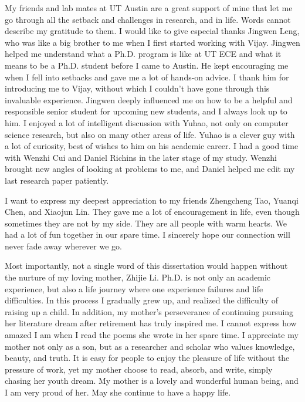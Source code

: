 \begin{acknowledgments}
My friends and lab mates at UT Austin are a great support of mine that let me go through all the setback and challenges in research, and in life. Words cannot describe my gratitude to them. I would like to give especial thanks Jingwen Leng, who was like a big brother to me when I first started working with Vijay. Jingwen helped me understand what a Ph.D. program is like at UT ECE and what it means to be a Ph.D. student before I came to Austin. He kept encouraging me when I fell into setbacks and gave me a lot of hands-on advice. I thank him for introducing me to Vijay, without which I couldn't have gone through this invaluable experience. Jingwen deeply influenced me on how to be a helpful and responsible senior student for upcoming new students, and I always look up to him. I enjoyed a lot of intelligent discussion with Yuhao, not only on computer science research, but also on many other areas of life. Yuhao is a clever guy with a lot of curiosity, best of wishes to him on his academic career. I had a good time with Wenzhi Cui and Daniel Richins in the later stage of my study. Wenzhi brought new angles of looking at problems to me, and Daniel helped me edit my last research paper patiently.

I want to express my deepest appreciation to my friends Zhengcheng Tao, Yuanqi Chen, and Xiaojun Lin. They gave me a lot of encouragement in life, even though sometimes they are not by my side. They are all people with warm hearts. We had a lot of fun together in our spare time. I sincerely hope our connection will never fade away wherever we go.

Most importantly, not a single word of this dissertation would happen without the nurture of my loving mother, Zhijie Li. Ph.D. is not only an academic experience, but also a life journey where one experience failures and life difficulties. In this process I gradually grew up, and realized the difficulty of raising up a child. In addition, my mother's perseverance of continuing pursuing her literature dream after retirement has truly inspired me. I cannot express how amazed I am when I read the poems she wrote in her spare time. I appreciate my mother not only as a son, but as a researcher and scholar who values knowledge, beauty, and truth. It is easy for people to enjoy the pleasure of life without the pressure of work, yet my mother choose to read, absorb, and write, simply chasing her youth dream. My mother is a lovely and wonderful human being, and I am very proud of her. May she continue to have a happy life.


\end{acknowledgments}
